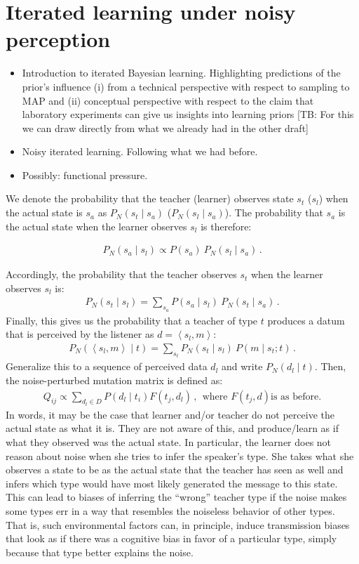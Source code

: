 \documentclass[10pt,a4paper]{article}
\newcommand{\tb}[1]{\textcolor[rgb]{.8,.33,.0}{[TB: #1]}}%
\newcommand{\tuple}[1]{\ensuremath{\left\langle #1 \right\rangle}}
\begin{document}
\section{Iterated learning under noisy perception}

\begin{itemize}
  \item Introduction to iterated Bayesian learning. Highlighting predictions of the prior's influence (i) from a technical perspective with respect to sampling to MAP and (ii) conceptual perspective with respect to the claim that laboratory experiments can give us insights into learning priors \tb{For this we can draw directly from what we already had in the other draft}
  \item Noisy iterated learning. Following what we had before.
  \item Possibly: functional pressure.
\end{itemize}

We denote the probability that the teacher (learner) observes state $s_t$ ($s_l$) when the actual state is $s_a$ as $P_N(s_t \mid s_a)$ ($P_N(s_l \mid s_a)$). The probability that $s_a$ is the actual state when the learner observes $s_l$ is therefore:

\begin{align*}
  P_N(s_a \mid s_l) \propto P(s_a) \ P_N(s_l \mid s_a)\,.
\end{align*}

Accordingly, the probability that the teacher observes $s_t$ when the learner observes $s_l$ is:
\begin{align*}
  P_N(s_t \mid s_l) = \sum_{s_a} P(s_a \mid s_l) \ P_N(s_t \mid s_a)\,.
\end{align*}
Finally, this gives us the probability that a teacher of type $t$ produces a datum that is
perceived by the listener as $d = \tuple{s_l, m}$:
\begin{align*}
  P_N(\tuple{s_l, m} \mid t) = \sum_{s_t} P_N(s_t \mid s_l) \ P(m \mid s_t; t)\,.
\end{align*}
Generalize this to a sequence of perceived data $d_l$ and write $P_N(d_l \mid t)$. Then, the noise-perturbed mutation matrix is defined as:
\begin{align*}
  Q_{ij}  \propto \sum_{d_l \in D} P(d_l \mid t_i) F(t_j,d_l) \,, \ \  \text{where $F(t_j,d)$
    is as before.}
\end{align*}
In words, it may be the case that learner and/or teacher do not perceive the actual state as what it is. They are not aware of this, and produce/learn as if what they observed was the actual state. In particular, the learner does not reason about noise when she tries to infer the speaker's type. She takes what she observes a state to be as the actual state that the teacher has seen as well and infers which type would have most likely generated the message to this state. This can lead to biases of inferring the ``wrong'' teacher type if the noise makes some types err in a way that resembles the noiseless behavior of other types. That is, such environmental factors can, in principle, induce transmission biases that look as if there was a cognitive bias in favor of a particular type, simply because that type better explains the noise.
\end{document}
